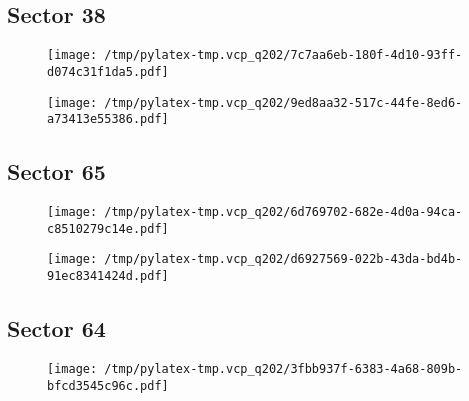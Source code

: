 \documentclass{report}%
\begin{document}
%
\subsection{Sector 38}%
\label{subsec:40575444838}%


\begin{figure}[H]%
\begin{center}%
\centering%
\texttt{[image: /tmp/pylatex-tmp.vcp\_q202/7c7aa6eb-180f-4d10-93ff-d074c31f1da5.pdf]}%
\end{center}%
\end{figure}

%


\begin{figure}[H]%
\begin{center}%
\centering%
\texttt{[image: /tmp/pylatex-tmp.vcp\_q202/9ed8aa32-517c-44fe-8ed6-a73413e55386.pdf]}%
\end{center}%
\end{figure}

%
\subsection{Sector 65}%
\label{subsec:40575444865}%


\begin{figure}[H]%
\begin{center}%
\centering%
\texttt{[image: /tmp/pylatex-tmp.vcp\_q202/6d769702-682e-4d0a-94ca-c8510279c14e.pdf]}%
\end{center}%
\end{figure}

%


\begin{figure}[H]%
\begin{center}%
\centering%
\texttt{[image: /tmp/pylatex-tmp.vcp\_q202/d6927569-022b-43da-bd4b-91ec8341424d.pdf]}%
\end{center}%
\end{figure}

%
\subsection{Sector 64}%
\label{subsec:40575444864}%


\begin{figure}[H]%
\begin{center}%
\centering%
\texttt{[image: /tmp/pylatex-tmp.vcp\_q202/3fbb937f-6383-4a68-809b-bfcd3545c96c.pdf]}%
\end{center}%
\end{figure}
\end{document}

